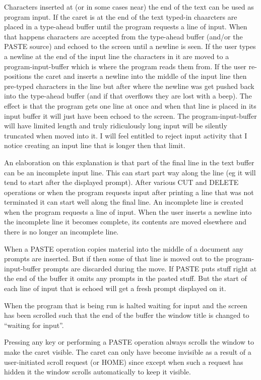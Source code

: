 \documentclass[a4paper,11pt]{article}
\begin{document}
Characters inserted at (or in some cases near) the end of the text can be
used as program input. If the caret is at the end of the text typed-in
chaarcters are placed in a type-ahead buffer until the program requests
a line of input. When that happens characters are accepted from the type-ahead
buffer (and/or the PASTE source) and echoed to the screen until a newline is
seen. If the user types a newline at the end of the input line the characters
in it are moved to a program-input-buffer which is where the program reads
them from.  If the user re-positions the caret and inserts a newline into the
middle of the input line then pre-typed characters in the line but after
where the newline was get pushed back into the type-ahead buffer (and if that
overflows they are lost with a beep). The effect is that the program gets
one line at once and when that line is placed in its input buffer it will just
have been echoed to the screen.  The program-input-buffer will have limited
length and truly ridiculously long input will be silently truncated when
moved into it.  I will feel entitled to reject input activity that I notice
creating an input line that is longer then that limit.

An elaboration on this explanation is that part of the final line in the
text buffer can be an incomplete input line. This can start part way along
the line (eg it will tend to start after the displayed prompt). After various
CUT and DELETE operations or when the program requests input after printing
a line that was not terminated it can start well along the final line. An
incomplete line is created when the program requests a line of input. When
the user inserts a newline into the incomplete line it becomes complete, its
contents are moved elsewhere and there is no longer an incomplete line.

When a PASTE operation copies material into the middle of a document any
prompts are inserted. But if then some of that line is moved out to the
program-input-buffer prompts are discarded during the move. If PASTE puts
stuff right at the end of the buffer it omits any prompts in the pasted
stuff.  But the start of each line of input that is echoed will get a fresh
prompt displayed on it.

When the program that is being run is halted waiting for input and the
screen has been scrolled such that the end of the buffer the window title is
changed to ``waiting for input''.

Pressing any key or performing a PASTE operation always scrolls the window
to make the caret visible. The caret can only have become invisible as a
result of a user-initiated scroll request (or HOME) since except when such a
request has hidden it the window scrolls automatically to keep it visible.
\end{document}
